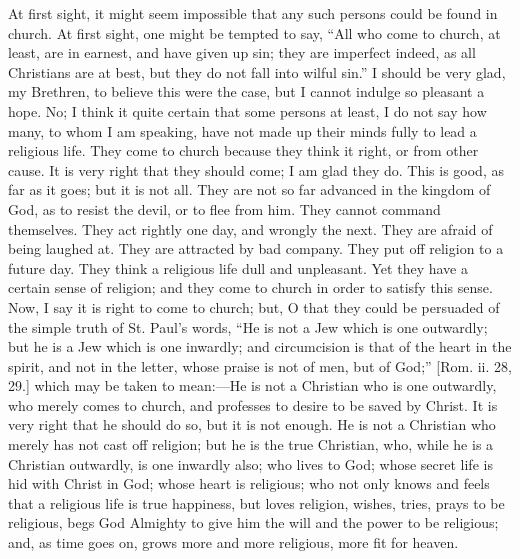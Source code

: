 At first sight, it might seem impossible that any such persons
could be found in church. At first sight, one might be tempted to say,
``All who come to church, at least, are in earnest, and have given
up sin; they are imperfect indeed, as all Christians are at best, but
they do not fall into wilful sin.'' I should be very glad, my
Brethren, to believe this were the case, but I cannot indulge so
pleasant a hope. No; I think it quite certain that some persons at
least, I do not say how many, to whom I am speaking, have not made up
their minds fully to lead a religious life. They come to church
because they think it right, or from other cause. It is very right
that they should come; I am glad they do. This is good, as far as it
goes; but it is not all. They are not so far advanced in the kingdom
of God, as to resist the devil, or to flee from him. They cannot
command themselves. They act rightly one day, and wrongly the next.
They are afraid of being laughed at. They are attracted by bad
company. They put off religion to a future day. They think a religious
life dull and unpleasant. Yet they have a certain sense of religion;
and they come to church in order to satisfy this sense. Now, I say it
is right to come to church; but, O that they could be persuaded of the
simple truth of St. Paul's words, ``He is not a Jew which is one
outwardly; but he is a Jew which is one inwardly; and circumcision is
that of the heart in the spirit, and not in the letter, whose praise
is not of men, but of God;'' [Rom. ii. 28, 29.] which may be taken
to mean:—He is not a Christian who is one outwardly, who merely
comes to church, and professes to desire to be saved by Christ. It is
very right that he should do so, but it is not enough. He is not a
Christian who merely has not cast off religion; but he is the true
Christian, who, while he is a Christian outwardly, is one inwardly
also; who lives to God; whose secret life is hid with Christ in God;
whose heart is religious; who not only knows and feels that a
religious life is true happiness, but loves religion, wishes, tries,
prays to be religious, begs God Almighty to give him the will and the
power to be religious; and, as time goes on, grows more and more
religious, more fit for heaven.

